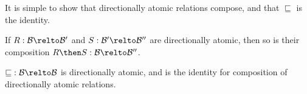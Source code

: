 \documentclass[a4paper,UKenglish,cleveref, autoref]{lipics-v2021}
\begin{document}
It is simple to show that directionally atomic relations compose, and that
$\sqsubseteq$ is the identity.
\begin{proposition}
  If \(R : \mathcal{B} \relto \mathcal{B}'\) and
  \(S : \mathcal{B}' \relto \mathcal{B}''\) are directionally atomic, then so is
  their composition \(R \then S : \mathcal{B} \relto \mathcal{B}''\).
\end{proposition}
%
%

\begin{proposition}
  \(\mathbin{\sqsubseteq} : \mathcal{B} \relto \mathcal{B}\) is directionally
  atomic, and is the identity for composition of directionally atomic relations.
\end{proposition}
\end{document}
